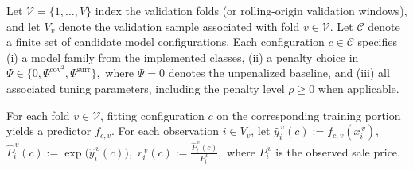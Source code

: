 \documentclass[12pt, draft]{article}
\theoremstyle{plain}
\theoremstyle{definition}
\newcommand{\1}{\mathbf{1}}
\begin{document}








Let $\mathcal V=\{1,\dots,V\}$ index the validation folds (or rolling-origin validation windows), and let $V_v$ denote the validation sample associated with fold $v\in\mathcal V$. Let $\mathcal C$ denote a finite set of candidate model configurations. Each configuration $c\in\mathcal C$ specifies
(i) a model family from the implemented classes,
(ii) a penalty choice in
$
\Psi \in \{0,\Psi^{\mathrm{cov}^2},\Psi^{\mathrm{surr}}\},
$
where $\Psi=0$ denotes the unpenalized baseline,
and
(iii) all associated tuning parameters, including the penalty level $\rho\ge 0$ when applicable.

For each fold $v\in\mathcal V$, fitting configuration $c$ on the corresponding training portion yields a predictor $f_{c,v}$. For each observation $i\in V_v$, let
$
\hat y_i^{\,v}(c):=f_{c,v}(x_i^{\,v})$, $
\hat P_i^{\,v}(c):=\exp\!\bigl(\hat y_i^{\,v}(c)\bigr),$
$r_i^{\,v}(c):=\frac{\hat P_i^{\,v}(c)}{P_i^{\,v}},
$
where $P_i^{\,v}$ is the observed sale price. 
\end{document}
